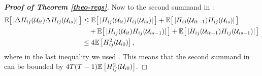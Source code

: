 \documentclass[a4paper,12pt]{article}
\makeatletter
\renewcommand{\eqref}[1]{\tagform@{\ref{#1}}}
\makeatother
\begin{document}
\begin{proof}[\textnormal{\textbf{Proof of Theorem \ref{theo-regs}}}]
Now to the second summand in \eqref{theo-regs-proof-4}:
\begin{align*}
\mathbb{E} \big[ \left|\Delta  H_{ij} (\mathcal{U}_{it}) \Delta  H_{ij} (\mathcal{U}_{is})\right| \big] &\leq \mathbb{E} \big[ \left| H_{ij} (\mathcal{U}_{it}) H_{ij} (\mathcal{U}_{is}) \right|\big] + \mathbb{E} \big[ \left| H_{ij} (\mathcal{U}_{it-1}) H_{ij} (\mathcal{U}_{is}) \right|\big] \\
&\quad + \mathbb{E} \big[ \left| H_{ij} (\mathcal{U}_{it}) H_{ij} (\mathcal{U}_{is-1}) \right|\big] + \mathbb{E} \big[ \left| H_{ij} (\mathcal{U}_{it-1}) H_{ij} (\mathcal{U}_{is-1}) \right|\big] \\
&\leq  4\mathbb{E} \left[ H^2_{ij}(\mathcal{U}_{i0}) \right],
\end{align*}
where in the last inequality we used \eqref{theo-regs-proof-5}. This means that the second summand in \eqref{theo-regs-proof-4} can be bounded by $4T(T-1) \mathbb{E} \left[ H^2_{ij} (\mathcal{U}_{i0}) \right]$.


\end{proof}
\end{document}
